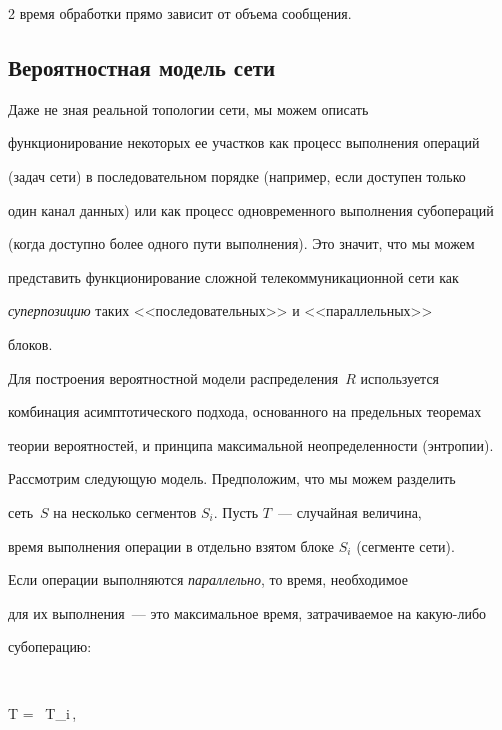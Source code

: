 \begin{multicols}{2}
время обработки прямо зависит от объема сообщения.





\subsection{Вероятностная модель сети} %





Даже не зная реальной топологии сети, мы можем описать


функционирование некоторых ее участков как процесс выполнения операций


(задач сети) в последовательном  порядке (например, если доступен только


один канал данных) или как процесс одновременного выполнения субопераций


(когда доступно более одного пути выполнения). Это значит, что мы можем


представить функционирование сложной телекоммуникационной сети как


\textit{суперпозицию} таких <<последовательных>> и <<параллельных>>


блоков.





Для построения вероятностной модели распределения~$R$ используется


комбинация асимптотического подхода, основанного на предельных теоремах


теории вероятностей, и принципа максимальной неопределенности (энтропии).





Рассмотрим следующую модель. Предположим, что мы можем разделить


сеть~$S$ на несколько сегментов $S_i$. Пусть $T$~--- случайная величина,


время выполнения операции в отдельно взятом блоке $S_i$ (сегменте сети).





Если операции выполняются \textit{параллельно}, то время, необходимое


для их выполнения~--- это максимальное время, затрачиваемое на какую-либо


субоперацию:


$$


T = \, T_i\,,



\end{multicols}
